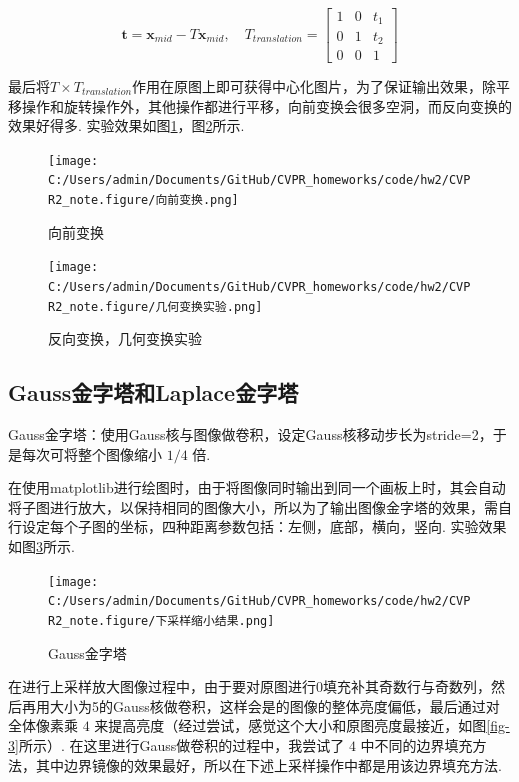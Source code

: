 \documentclass[12pt, a4paper, oneside]{ctexart}
\numberwithin{equation}{section}  %
\begin{document}
\[\boldsymbol{t} = \boldsymbol{x}_{mid} - T\boldsymbol{x}_{mid},\quad T_{translation}=\left[\begin{matrix}1&0&t_1\\ 0&1&t_2\\0&0&1\end{matrix}\right]\]

最后将$T\times T_{translation}$作用在原图上即可获得中心化图片，为了保证输出效果，除平移操作和旋转操作外，其他操作都进行平移，向前变换会很多空洞，而反向变换的效果好得多. 实验效果如图\ref{fig-0}，图\ref{fig-1}所示.

\begin{figure}[htbp]
    \centering
    \hspace*{-1.5cm}
    \texttt{[image: C:/Users/admin/Documents/GitHub/CVPR\_homeworks/code/hw2/CVPR2\_note.figure/向前变换.png]}
    \caption{向前变换\label{fig-0}}
\end{figure}
\begin{figure}[htbp]
    \centering
    \hspace*{-1.5cm}
    \texttt{[image: C:/Users/admin/Documents/GitHub/CVPR\_homeworks/code/hw2/CVPR2\_note.figure/几何变换实验.png]}
    \caption{反向变换，几何变换实验\label{fig-1}}
\end{figure}

\subsection{Gauss金字塔和Laplace金字塔}

Gauss金字塔：使用Gauss核与图像做卷积，设定Gauss核移动步长为stride=2，于是每次可将整个图像缩小
\(1/4\) 倍.

在使用matplotlib进行绘图时，由于将图像同时输出到同一个画板上时，其会自动将子图进行放大，以保持相同的图像大小，所以为了输出图像金字塔的效果，需自行设定每个子图的坐标，四种距离参数包括：左侧，底部，横向，竖向. 实验效果如图\ref{fig-2}所示.

\begin{figure}[htbp]
    \centering
    \texttt{[image: C:/Users/admin/Documents/GitHub/CVPR\_homeworks/code/hw2/CVPR2\_note.figure/下采样缩小结果.png]}
    \caption{Gauss金字塔\label{fig-2}}
\end{figure}

在进行上采样放大图像过程中，由于要对原图进行0填充补其奇数行与奇数列，然后再用大小为5的Gauss核做卷积，这样会是的图像的整体亮度偏低，最后通过对全体像素乘
\(4\) 来提高亮度（经过尝试，感觉这个大小和原图亮度最接近，如图\ref{fig-3}所示）.
在这里进行Gauss做卷积的过程中，我尝试了 \(4\)
中不同的边界填充方法，其中边界镜像的效果最好，所以在下述上采样操作中都是用该边界填充方法.
\end{document}
